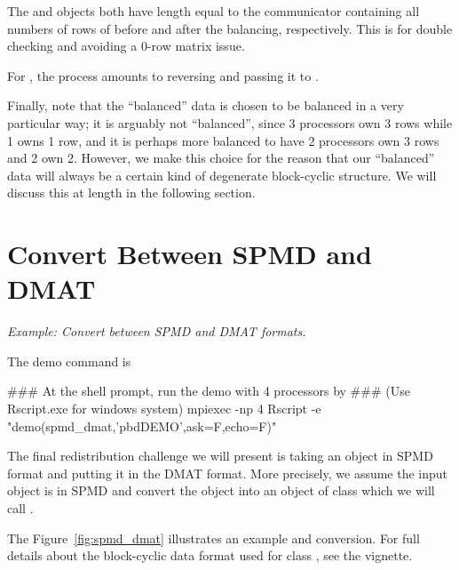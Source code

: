 The  and  objects both have length equal to the communicator containing all numbers of rows of  before and after the balancing, respectively. This is for double checking and avoiding a 0-row matrix issue.

For , the process amounts to reversing  and passing it to .

Finally, note that the ``balanced'' data is chosen to be balanced in a very particular way; it is arguably not ``balanced'', since 3 processors own 3 rows while 1 owns 1 row, and it is perhaps more balanced to have 2 processors own 3 rows and 2 own 2.  However, we make this choice for the reason that our ``balanced'' data will always be a certain kind of degenerate block-cyclic structure.  We will discuss this at length in the following section.




\section{Convert Between SPMD and DMAT}
\label{sec:spmd_dmat}

\emph{Example:  Convert between SPMD and DMAT formats.}

The demo command is
\begin{Command}
### At the shell prompt, run the demo with 4 processors by
### (Use Rscript.exe for windows system)
mpiexec -np 4 Rscript -e "demo(spmd_dmat,'pbdDEMO',ask=F,echo=F)"
\end{Command}

The final redistribution challenge we will present is taking an object in SPMD format and putting it in the DMAT format.  More precisely, we assume the input object  is in SPMD and convert the object into an object of
class 
which we will call .


The Figure~\ref{fig:spmd_dmat} illustrates an example  and  conversion.  For full details about the block-cyclic data format used for
class ,
see the  vignette.  

